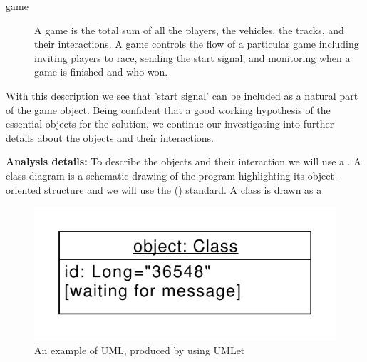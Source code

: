\documentclass[fsharpnotes.tex]{subfiles}
\begin{document}
\begin{description}
\item[game] A game is the total sum of all the players, the vehicles, the tracks, and their interactions. A game controls the flow of a particular game including inviting players to race, sending the start signal, and monitoring when a game is finished and who won.
\end{description}
With this description we see that 'start signal' can be included as a natural part of the game object. Being confident that a good working hypothesis of the essential objects for the solution, we continue our investigating into further details about the objects and their interactions.

\textbf{Analysis details:} To describe the objects and their interaction we will use a . A class diagram is a schematic drawing of the program highlighting its object-oriented structure and we will use the  () \cite{uml2} standard. A class is drawn as a 

\begin{figure}
  \centering
  \includegraphics[width=0.3\linewidth]{carRace}
  \caption{An example of UML, produced by using UMLet \cite{umlet}}
  \label{uml}
\end{figure}
\end{document}
